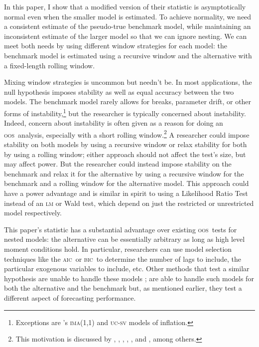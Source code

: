 \documentclass[11pt,fleqn]{article}
\newcommand\citepos[2][]{\citeauthor{#2}'s \citeyearpar[#1]{#2}}
\theoremstyle{definition}
\newcommand{\aic}{\textsc{aic}}
\newcommand{\bic}{\textsc{bic}}
\newcommand{\oos}{\textsc{oos}}
\begin{document}
In this paper, I show that a modified version of their statistic is
asymptotically normal even when the smaller model is estimated.  To
achieve normality, we need a consistent estimate of the pseudo-true
benchmark model, while maintaining an inconsistent estimate of the
larger model so that we can ignore nesting.  We can meet both needs by
using different window strategies for each model: the benchmark model
is estimated using a recursive window and the alternative with a
fixed-length rolling window.

Mixing window strategies is uncommon but needn't be. In most
applications, the null hypothesis imposes stability as well as equal
accuracy between the two models.  The benchmark model rarely allows
for breaks, parameter drift, or other forms of
instability,\footnote{Exceptions are \citepos{StW:07}
  \textsc{ima}(1,1) and \textsc{uc-sv} models of inflation.} but the
researcher is typically concerned about instability.  Indeed, concern
about instability is often given as a reason for doing an \oos\
analysis, especially with a short rolling window.\footnote{This
  motivation is discussed by \citet{StW:03}, \citet{PeT:05,PeT:07},
  \cite{GiW:06}, \citet{GoW:08}, \citet{ClM:09c}, and
  \cite{GiR:09,GiR:10}, among others.} A researcher could impose
stability on both models by using a recursive window or relax
stability for both by using a rolling window; either approach should
not affect the test's size, but may affect power.  But the researcher
could instead impose stability on the benchmark and relax it for the
alternative by using a recursive window for the benchmark and a
rolling window for the alternative model.  This approach could have a
power advantage and is similar in spirit to using a Likelihood Ratio
Test instead of an \textsc{lm} or Wald test, which depend on just the
restricted or unrestricted model respectively.

This paper's statistic has a substantial advantage over existing \oos\
tests for nested models: the alternative can be essentially arbitrary
as long as high level moment conditions hold.  In particular,
researchers can use model selection techniques like the \aic\ or \bic\
to determine the number of lags to include, the particular exogenous
variables to include, etc.  Other methods that test a similar
hypothesis are unable to handle these models \citep[except][which does
not allow the benchmark to be estimated]{ClW:06}; \citet{GiW:06} are
able to handle such models for both the alternative and the benchmark
but, as mentioned earlier, they test a different aspect of forecasting
performance.
\end{document}
